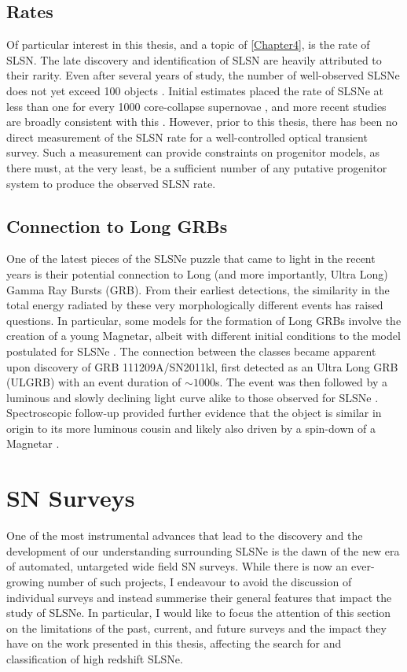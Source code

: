 \subsection{Rates}
Of particular interest in this thesis, and a topic of \cref{Chapter4}, is the rate of SLSN. The late discovery and identification of SLSN are heavily attributed to their rarity. Even after several years of study, the number of well-observed SLSNe does not yet exceed 100 objects \citep[e.g., see compilations in][]{Inserra2014,Papadopoulus2015,Nicholl2015,DeCia2018}. Initial estimates placed the rate of SLSNe at less than one for every 1000 core-collapse supernovae \citep{Quimby2011}, and more recent studies are broadly consistent with this \citep{Quimby2013,McCrum2015}. However, prior to this thesis, there has been no direct measurement of the SLSN rate for a well-controlled optical transient survey. Such a measurement can provide constraints on progenitor models, as there must, at the very least, be a sufficient number of any putative progenitor system to produce the observed SLSN rate.

\subsection{Connection to Long GRBs}
One of the latest pieces of the SLSNe puzzle that came to light in the recent years is their potential connection to Long (and more importantly, Ultra Long) Gamma Ray Bursts (GRB). From their earliest detections, the similarity in the total energy radiated by these very morphologically different events has raised questions. In particular, some models for the formation of Long GRBs involve the creation of a young Magnetar, albeit with different initial conditions to the model postulated for SLSNe \citep{Margalit2018}. The connection between the classes became apparent upon discovery of GRB 111209A/SN2011kl, first detected as an Ultra Long GRB (ULGRB) with an event duration of $\sim1000$s. The event was then followed by a luminous and slowly declining light curve alike to those observed for SLSNe \citep{Greiner2015}. Spectroscopic follow-up provided further evidence that the object is similar in origin to its more luminous cousin \citep{Mazzali2015} and likely also driven by a spin-down of a Magnetar \citep{Metzger2015}.

\section{SN Surveys}
One of the most instrumental advances that lead to the discovery and the development of our understanding surrounding SLSNe is the dawn of the new era of automated, untargeted wide field SN surveys. While there is now an ever-growing number of such projects, I endeavour to avoid the discussion of individual surveys and instead summerise their general features that impact the study of SLSNe. In particular, I would like to focus the attention of this section on the limitations of the past, current, and future surveys and the impact they have on the work presented in this thesis, affecting the search for and classification of high redshift SLSNe.

